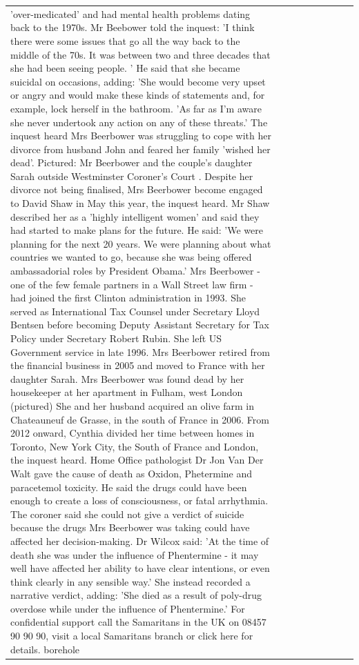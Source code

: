 \begin{table}[H]
\begin{tabular}{lllrlllll}
'over-medicated' and had mental health problems dating back to the 1970s. Mr Beebower told the inquest: 'I think there were some issues that go all the way back to the middle of the 70s. It was between two and three decades that she had been seeing people. ' He said that she became suicidal on occasions, adding: 'She would become very upset or angry and would make these kinds of statements and, for example, lock herself in the bathroom. 'As far as I'm aware she never undertook any action on any of these threats.' The inquest heard Mrs Beerbower was struggling to cope with her divorce from husband John and feared her family 'wished her dead'. Pictured: Mr Beerbower and the couple's daughter Sarah outside Westminster Coroner's Court . Despite her divorce not being finalised, Mrs Beerbower become engaged to David Shaw in May this year, the inquest heard. Mr Shaw described her as a 'highly intelligent women' and said they had started to make plans for the future. He said: 'We were planning for the next 20 years. We were planning about what countries we wanted to go, because she was being offered ambassadorial roles by President Obama.' Mrs Beerbower - one of the few female partners in a Wall Street law firm - had joined the first Clinton administration in 1993. She served as International Tax Counsel under Secretary Lloyd Bentsen before becoming Deputy Assistant Secretary for Tax Policy under Secretary Robert Rubin. She left US Government service in late 1996. Mrs Beerbower retired from the financial business in 2005 and moved to France with her daughter Sarah. Mrs Beerbower was found dead by her housekeeper at her apartment in Fulham, west London (pictured) She and her husband acquired an olive farm in Chateauneuf de Grasse, in the south of France in 2006. From 2012 onward, Cynthia divided her time between homes in Toronto, New York City, the South of France and London, the inquest heard. Home Office pathologist Dr Jon Van Der Walt gave the cause of death as Oxidon, Phetermine and paracetemol toxicity. He said the drugs could have been enough to create a loss of consciousness, or fatal arrhythmia. The coroner said she could not give a verdict of suicide because the drugs Mrs Beerbower was taking could have affected her decision-making. Dr Wilcox said: 'At the time of death she was under the influence of Phentermine - it may well have affected her ability to have clear intentions, or even think clearly in any sensible way.' She instead recorded a narrative verdict, adding: 'She died as a result of poly-drug overdose while under the influence of Phentermine.' For confidential support call the Samaritans in the UK on 08457 90 90 90, visit a local Samaritans branch or click here for details. borehole \\

\end{tabular}
\end{table}
